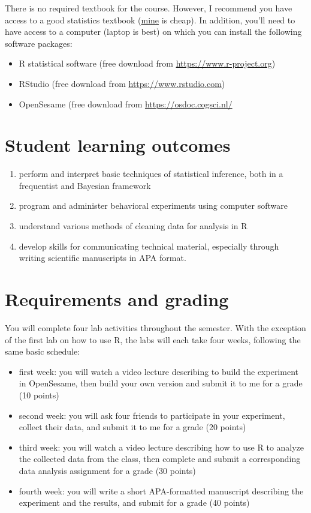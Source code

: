\documentclass[10pt]{article}
\begin{document}
There is no required textbook for the course. However, I recommend you have access to a good statistics textbook (\href{https://www.amazon.com/Psychological-Statistics-Basics-Thomas-Faulkenberry-dp-1032020954/dp/1032020954}{mine} is cheap). In addition, you'll need to have access to a computer (laptop is best) on which you can install the following software packages:

\begin{itemize}
\item R statistical software (free download from \href{http://www.r-project.org}{https://www.r-project.org})
\item RStudio (free download from \href{http://www.rstudio.com}{https://www.rstudio.com})
\item OpenSesame (free download from \url{https://osdoc.cogsci.nl/}
\end{itemize}

\section*{Student learning outcomes}
\label{sec:orgc8d1939}

\begin{enumerate}
\item perform and interpret basic techniques of statistical inference, both in a frequentist and Bayesian framework
\item program and administer behavioral experiments using computer software
\item understand various methods of cleaning data for analysis in R
\item develop skills for communicating technical material, especially through writing scientific manuscripts in APA format.
\end{enumerate}

\section*{Requirements and grading}
\label{sec:orgdd8a9ba}

You will complete four lab activities throughout the semester. With the exception of the first lab on how to use R, the labs will each take four weeks, following the same basic schedule:

\begin{itemize}
\item first week: you will watch a video lecture describing to build the experiment in OpenSesame, then build your own version and submit it to me for a grade (10 points)
\item second week: you will ask four friends to participate in your experiment, collect their data, and submit it to me for a grade (20 points)
\item third week: you will watch a video lecture describing how to use R to analyze the collected data from the class, then complete and submit a corresponding data analysis assignment for a grade (30 points)
\item fourth week: you will write a short APA-formatted manuscript describing the experiment and the results, and submit for a grade (40 points)
\end{itemize}
\end{document}
